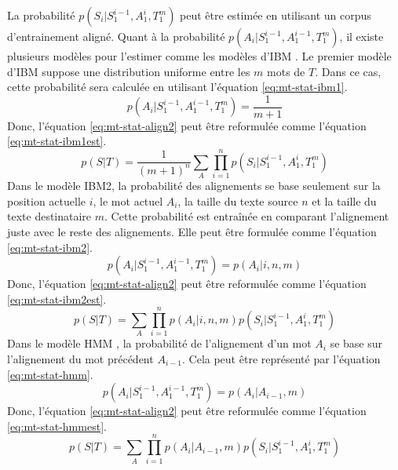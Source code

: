 \documentclass{KodeBook}
\begin{document}
La probabilité $p(S_i | S_1^{i-1}, A_1^{i}, T_1^{m})$ peut être estimée en utilisant un corpus d'entrainement aligné. 
Quant à la probabilité $p(A_i | S_1^{i-1}, A_1^{i-1}, T_1^{m})$, il existe plusieurs modèles pour l'estimer comme les modèles d'IBM \cite{1993-brown-al}.
Le premier modèle d'IBM suppose une distribution uniforme entre les $m$ mots de $T$. 
Dans ce cas, cette probabilité sera calculée en utilisant l'équation \ref{eq:mt-stat-ibm1}. 
\begin{equation}\label{eq:mt-stat-ibm1}
p(A_i | S_1^{i-1}, A_1^{i-1}, T_1^{m}) = \frac{1}{m+1}
\end{equation}
Donc, l'équation \ref{eq:mt-stat-align2} peut être reformulée comme l'équation \ref{eq:mt-stat-ibm1est}.
\begin{equation}\label{eq:mt-stat-ibm1est}
p(S|T) = \frac{1}{(m+1)^n} \sum_{A} \prod_{i=1}^{n} p(S_i | S_1^{i-1}, A_1^{i}, T_1^{m})
\end{equation}
Dans le modèle IBM2, la probabilité des alignements se base seulement sur la position actuelle $i$, le mot actuel $A_i$, la taille du texte source $n$ et la taille du texte destinataire $m$. 
Cette probabilité est entraînée en comparant l'alignement juste avec le reste des alignements.
Elle peut être formulée comme l'équation \ref{eq:mt-stat-ibm2}.
\begin{equation}\label{eq:mt-stat-ibm2}
p(A_i | S_1^{i-1}, A_1^{i-1}, T_1^{m}) = p(A_i | i, n, m)
\end{equation}
Donc, l'équation \ref{eq:mt-stat-align2} peut être reformulée comme l'équation \ref{eq:mt-stat-ibm2est}.
\begin{equation}\label{eq:mt-stat-ibm2est}
p(S|T) = \sum_{A} \prod_{i=1}^{n} p(A_i | i, n, m) p(S_i | S_1^{i-1}, A_1^{i}, T_1^{m})
\end{equation}
Dans le modèle HMM \cite{96-vogel-al}, la probabilité de l'alignement d'un mot $A_i$ se base sur l'alignement du mot précédent $A_{i-1}$.
Cela peut être représenté par l'équation \ref{eq:mt-stat-hmm}.
\begin{equation}\label{eq:mt-stat-hmm}
p(A_i | S_1^{i-1}, A_1^{i-1}, T_1^{m}) = p(A_i | A_{i-1}, m)
\end{equation}
Donc, l'équation \ref{eq:mt-stat-align2} peut être reformulée comme l'équation \ref{eq:mt-stat-hmmest}.
\begin{equation}\label{eq:mt-stat-hmmest}
p(S|T) = \sum_{A} \prod_{i=1}^{n} p(A_i | A_{i-1}, m) p(S_i | S_1^{i-1}, A_1^{i}, T_1^{m})
\end{equation}
\end{document}
